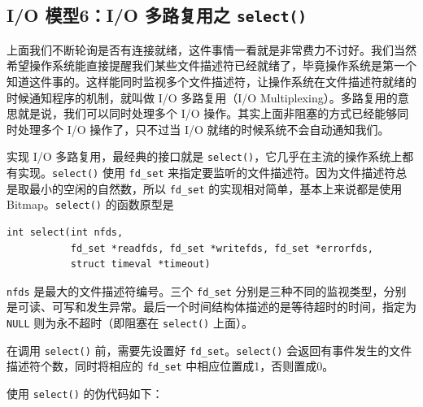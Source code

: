 \documentclass[a4paper]{article}
\begin{document}
\subsection{I/O 模型6：I/O 多路复用之 \texttt{select()}}

上面我们不断轮询是否有连接就绪，这件事情一看就是非常费力不讨好。我们当然希望操作系统能直接提醒我们某些文件描述符已经就绪了，毕竟操作系统是第一个知道这件事的。这样能同时监视多个文件描述符，让操作系统在文件描述符就绪的时候通知程序的机制，就叫做 I/O 多路复用（I/O Multiplexing）。多路复用的意思就是说，我们可以同时处理多个 I/O 操作。其实上面非阻塞的方式已经能够同时处理多个 I/O 操作了，只不过当 I/O 就绪的时候系统不会自动通知我们。

实现 I/O 多路复用，最经典的接口就是 \texttt{select()}，它几乎在主流的操作系统上都有实现。\texttt{select()} 使用 \texttt{fd\_set} 来指定要监听的文件描述符。因为文件描述符总是取最小的空闲的自然数，所以 \texttt{fd\_set} 的实现相对简单，基本上来说都是使用 Bitmap。\texttt{select()} 的函数原型是

\begin{verbatim}
int select(int nfds,
           fd_set *readfds, fd_set *writefds, fd_set *errorfds,
           struct timeval *timeout)
\end{verbatim}

\texttt{nfds} 是最大的文件描述符编号。三个 \texttt{fd\_set} 分别是三种不同的监视类型，分别是可读、可写和发生异常。最后一个时间结构体描述的是等待超时的时间，指定为 \texttt{NULL} 则为永不超时（即阻塞在 \texttt{select()} 上面）。

在调用 \texttt{select()} 前，需要先设置好 \texttt{fd\_set}。\texttt{select()} 会返回有事件发生的文件描述符个数，同时将相应的 \texttt{fd\_set} 中相应位置成1，否则置成0。

使用 \texttt{select()} 的伪代码如下：
\end{document}
